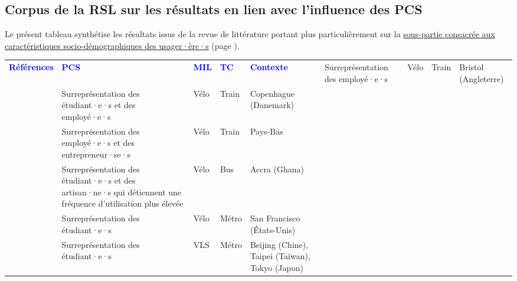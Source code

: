     \newpage
\subsection{Corpus de la \acrshort{RSL} sur les résultats en lien avec l'influence des \acrshort{PCS}}
    \label{donnees-ouvertes:rsl_resultats_pcs}
    
Le présent tableau synthétise les résultats issus de la revue de littérature portant plus particulièrement sur la \hyperref[Caractéristiques socio-démographiques des usagers]{sous-partie consacrée aux caractéristiques socio-démographiques des usager·ère·s} (page \pageref{Caractéristiques socio-démographiques des usagers}).\par

        \begin{longtable}{p{3cm}p{4cm}p{1.5cm}p{1.8cm}p{2.3cm}}
        \hline
        \textcolor{blue}{\textbf{Références}} & \textcolor{blue}{\textbf{\acrshort{PCS}}} & \textcolor{blue}{\textbf{MIL}} & \textcolor{blue}{\textbf{TC}} & \textcolor{blue}{\textbf{Contexte}}
        \hline
        \endhead
    \small{\textcite{sherwin_practices_2011}} & \small{Surreprésentation des employé·e·s} & \small{Vélo} & \small{Train} & \small{Bristol (Angleterre)}\\
    \small{\textcite{halldorsdottir_home-end_2017}} & \small{Surreprésentation des étudiant·e·s et des employé·e·s} & \small{Vélo} & \small{Train} & \small{Copenhague (Danemark)}\\
    \small{\textcite{jonkeren_bicycle-train_2021}} & \small{Surreprésentation des employé·e·s et des entrepreneur·se·s} & \small{Vélo} & \small{Train} & \small{Pays-Bas}\\
    \small{\textcite{quarshie_integrating_2007}} & \small{Surreprésentation des étudiant·e·s et des artisan·ne·s qui détiennent une fréquence d'utilisation plus élevée} & \small{Vélo} & \small{Bus} & \small{Accra (Ghana)}\\
    \small{\textcite{cervero_bike-and-ride_2013}} & \small{Surreprésentation des étudiant·e·s} & \small{Vélo} & \small{Métro} & \small{San Francisco (États-Unis)}\\
    \small{\textcite{lin_built_2018}} & \small{Surreprésentation des étudiant·e·s} & \small{VLS} & \small{Métro} & \small{Beijing (Chine), Taipei (Taïwan), Tokyo (Japon)}\\

\end{longtable}
